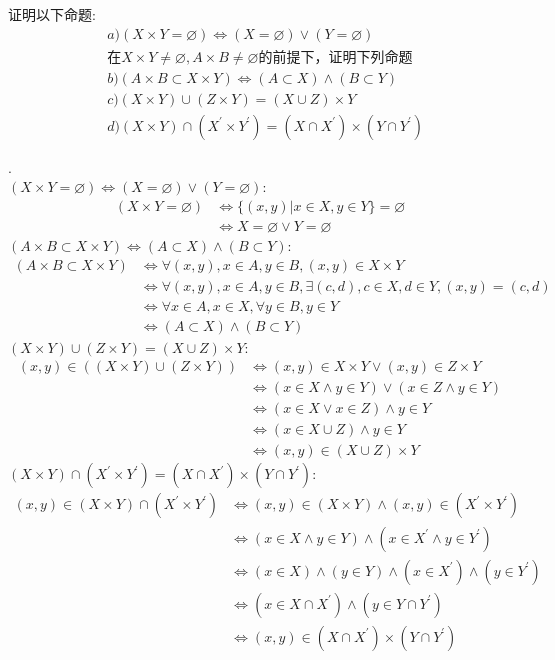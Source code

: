 \begin{exercise}
    证明以下命题:
    \begin{align*}
        &a) (X\times Y=\varnothing )\Leftrightarrow (X = \varnothing)\lor (Y=\varnothing)\\
        &\text{在}X\times Y\neq \varnothing, A\times B\neq \varnothing \text{的前提下，证明下列命题}\\
        &b) (A\times B\subset X\times Y)\Leftrightarrow (A\subset X)\land (B\subset Y)\\
        &c) (X\times Y)\cup (Z\times Y)=(X\cup Z)\times Y\\
        &d) (X\times Y)\cap (X^\prime \times Y^\prime)=(X\cap X^\prime)\times (Y\cap Y^\prime)  
    \end{align*}
\end{exercise}
\begin{solution}.\\
$(X\times Y=\varnothing )\Leftrightarrow (X = \varnothing)\lor (Y=\varnothing)$:
\begin{align*}
(X\times Y=\varnothing )&\iff \{(x,y)|x\in X,y\in Y\}=\varnothing\\
&\iff X=\varnothing \lor Y=\varnothing
\end{align*}
$(A\times B\subset X\times Y)\Leftrightarrow (A\subset X)\land (B\subset Y)$:
\begin{align*}
    (A\times B\subset X\times Y)&\Leftrightarrow \forall (x,y),x\in A,y\in B,(x,y)\in X\times Y\\
    &\Leftrightarrow \forall (x,y),x\in A,y\in B, \exists (c,d),c\in X,d\in Y,(x,y)=(c,d)\\
    &\Leftrightarrow \forall x\in A,x\in X,\forall y\in B,y\in Y\\
    &\Leftrightarrow (A\subset X)\land (B\subset Y)
\end{align*}
$(X\times Y)\cup (Z\times Y)=(X\cup Z)\times Y$:
\begin{align*}
    (x,y)\in ((X\times Y)\cup (Z\times Y))&\iff (x,y)\in X\times Y\lor (x,y)\in Z\times Y\\
    &\iff (x\in X\land y\in Y)\lor(x\in Z\land y\in Y)\\
    &\iff (x\in X\lor x\in Z)\land y\in Y\\
    &\iff (x\in X\cup Z)\land y\in Y\\
    &\iff (x,y) \in (X\cup Z)\times Y
\end{align*}
$(X\times Y)\cap (X^\prime \times Y^\prime)=(X\cap X^\prime)\times (Y\cap Y^\prime)$:
\begin{align*}
    (x,y)\in (X\times Y)\cap (X^\prime \times Y^\prime)&\iff (x,y)\in (X\times Y)\land (x,y)\in (X^\prime \times Y^\prime)\\
    &\iff (x\in X\land y\in Y)\land (x\in X^\prime\land y\in Y^\prime)\\
    &\iff (x\in X)\land (y\in Y)\land (x\in X^\prime)\land (y\in Y^\prime)\\
    &\iff (x\in X\cap X^\prime)\land (y\in Y\cap Y^\prime)\\
    &\iff (x,y)\in (X\cap X^\prime)\times (Y\cap Y^\prime)
\end{align*}
\end{solution}
